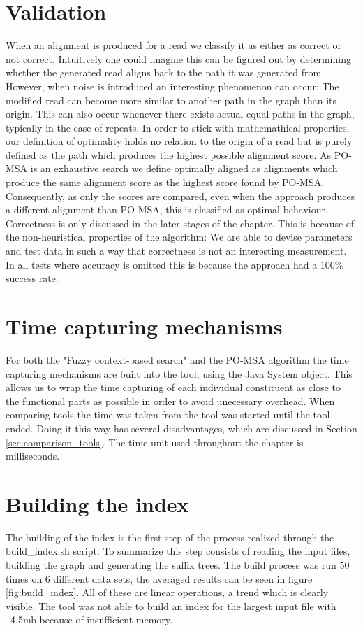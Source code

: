 \documentclass[thesis.tex]{subfiles}
\begin{document}
\section{Validation}
\label{sec:performance_validation}
When an alignment is produced for a read we classify it as either as correct or not correct. Intuitively one could imagine this can be figured out by determining whether the generated read aligns back to the path it was generated from. However, when noise is introduced an interesting phenomenon can occur: The modified read can become more similar to another path in the graph than its origin. This can also occur whenever there exists actual equal paths in the graph, typically in the case of repeats. In order to stick with mathemathical properties, our definition of optimality holds no relation to the origin of a read but is purely defined as the path which produces the highest possible alignment score. As PO-MSA is an exhaustive search we define optimally aligned as alignments which produce the same alignment score as the highest score found by PO-MSA. Consequently, as only the scores are compared, even when the approach produces a different alignment than PO-MSA, this is classified as optimal behaviour. Correctness is only discussed in the later stages of the chapter. This is because of the non-heuristical properties of the algorithm: We are able to devise parameters and test data in such a way that correctness is not an interesting measurement. In all tests where accuracy is omitted this is because the approach had a 100\% success rate.
\par\noindent
\section{Time capturing mechanisms}
For both the "Fuzzy context-based search" and the PO-MSA algorithm the time capturing mechanisms are built into the tool, using the Java System object. This allows us to wrap the time capturing of each individual constituent as close to the functional parts as possible in order to avoid unecessary overhead. When comparing tools the time was taken from the tool was started until the tool ended. Doing it this way has several disadvantages, which are discussed in Section \ref{sec:comparison_tools}. The time unit used throughout the chapter is milliseconds.
\section{Building the index}
The building of the index is the first step of the process realized through the build\_index.sh script. To summarize this step consists of reading the input files, building the graph and generating the suffix trees. The build process was run 50 times on 6 different data sets, the averaged results can be seen in figure \ref{fig:build_index}. All of these are linear operations, a trend which is clearly visible. The tool was not able to build an index for the largest input file with ~4.5mb because of insufficient memory.\\
\end{document}
